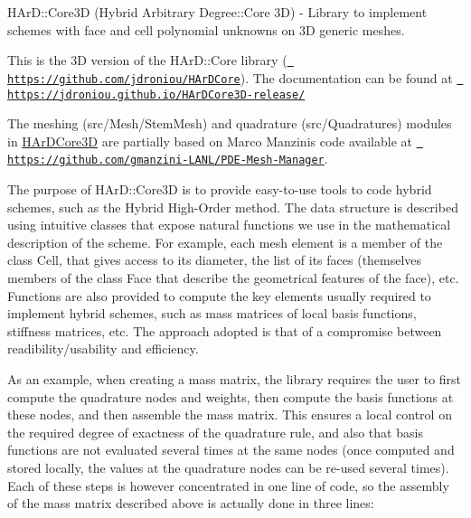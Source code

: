 H\+Ar\+D\+::\+Core3D (Hybrid Arbitrary Degree\+::\+Core 3D) -\/ Library to implement schemes with face and cell polynomial unknowns on 3D generic meshes.

This is the 3D version of the H\+Ar\+D\+::\+Core library (\href{https://github.com/jdroniou/HArDCore}{\texttt{ https\+://github.\+com/jdroniou/\+H\+Ar\+D\+Core}}). The documentation can be found at \href{https://jdroniou.github.io/HArDCore3D-release/}{\texttt{ https\+://jdroniou.\+github.\+io/\+H\+Ar\+D\+Core3\+D-\/release/}}

The meshing (src/\+Mesh/\+Stem\+Mesh) and quadrature (src/\+Quadratures) modules in \mbox{\hyperlink{namespaceHArDCore3D}{H\+Ar\+D\+Core3D}} are partially based on Marco Manzini\textquotesingle{}s code available at \href{https://github.com/gmanzini-LANL/PDE-Mesh-Manager}{\texttt{ https\+://github.\+com/gmanzini-\/\+L\+A\+N\+L/\+P\+D\+E-\/\+Mesh-\/\+Manager}}.

The purpose of H\+Ar\+D\+::\+Core3D is to provide easy-\/to-\/use tools to code hybrid schemes, such as the Hybrid High-\/\+Order method. The data structure is described using intuitive classes that expose natural functions we use in the mathematical description of the scheme. For example, each mesh element is a member of the class \textquotesingle{}Cell\textquotesingle{}, that gives access to its diameter, the list of its faces (themselves members of the class \textquotesingle{}Face\textquotesingle{} that describe the geometrical features of the face), etc. Functions are also provided to compute the key elements usually required to implement hybrid schemes, such as mass matrices of local basis functions, stiffness matrices, etc. The approach adopted is that of a compromise between readibility/usability and efficiency.

As an example, when creating a mass matrix, the library requires the user to first compute the quadrature nodes and weights, then compute the basis functions at these nodes, and then assemble the mass matrix. This ensures a local control on the required degree of exactness of the quadrature rule, and also that basis functions are not evaluated several times at the same nodes (once computed and stored locally, the values at the quadrature nodes can be re-\/used several times). Each of these steps is however concentrated in one line of code, so the assembly of the mass matrix described above is actually done in three lines\+:


\begin{DoxyCode}{0}
\end{DoxyCode}


